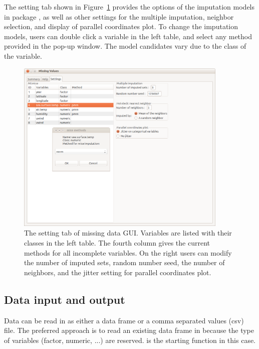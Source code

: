 \documentclass[article]{jss}
\begin{document}
The setting tab shown in Figure~\ref{fig: missingGUI-setting} provides the options 
of the imputation models in package , as well as other settings for 
the multiple imputation, neighbor selection, and display of parallel 
coordinates plot. To change the imputation models, users can double click a 
variable in the left table, and select any method provided in the pop-up window. 
The model candidates vary due to the class of the variable.

\begin{center}
\begin{figure}[h]
\begin{centering}
\includegraphics[width=0.9\textwidth]{graph/fig1-GUI-tab3}
\par\end{centering}
\caption{The setting tab of missing data GUI. Variables are listed with their classes in the left table. The fourth column gives the current  methods for all incomplete variables. On the right users can modify the number of imputed sets, random number seed, the number of neighbors, and the jitter setting for parallel coordinates plot.}
\label{fig: missingGUI-setting}
\end{figure}
\par\end{center}


\subsection{Data input and output}

Data can be read in as either a data frame or a comma separated values (csv) file. The preferred approach is to read an existing data frame in  because the type of variables (factor, numeric, ...) are reserved.  is the starting function in this case.
\end{document}
